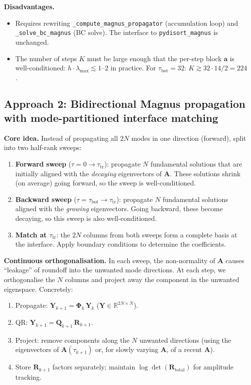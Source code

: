 \documentclass[11pt,a4paper]{article}
\newcommand{\R}{\mathbb{R}}
\newcommand{\mat}[1]{\mathbf{#1}}
\newcommand{\tbot}{\tau_{\mathrm{bot}}}
\newcommand{\ttrans}{\tau_{\mathrm{tr}}}
\theoremstyle{definition}
\begin{document}
\textbf{Disadvantages.}
\begin{itemize}[nosep]
\item Requires rewriting \texttt{\_compute\_magnus\_propagator} (accumulation
  loop) and \texttt{\_solve\_bc\_magnus} (BC solve).  The interface to
  \texttt{pydisort\_magnus} is unchanged.
\item The number of steps $K$ must be large enough that the per-step block
  $\mat{a}$ is well-conditioned:
  $h\cdot\lambda_{\max}\lesssim 1$--$2$ in practice.
  For $\tbot=32$: $K\gtrsim 32\cdot 14/2 = 224$.
\end{itemize}


\subsection{Approach 2: Bidirectional Magnus propagation with
mode-partitioned interface matching}\label{sec:approach2}

\textbf{Core idea.}  Instead of propagating all $2N$ modes in one direction
(forward), split into two half-rank sweeps:
\begin{enumerate}[nosep]
\item \textbf{Forward sweep} ($\tau=0\to\ttrans$): propagate $N$
  fundamental solutions that are initially aligned with the
  \emph{decaying} eigenvectors of $\mat{A}$.  These solutions shrink
  (on average) going forward, so the sweep is well-conditioned.
\item \textbf{Backward sweep} ($\tau=\tbot\to\ttrans$): propagate $N$
  fundamental solutions aligned with the \emph{growing} eigenvectors.
  Going backward, these become decaying, so this sweep is also
  well-conditioned.
\item \textbf{Match at $\ttrans$}: the $2N$ columns from both sweeps form
  a complete basis at the interface.  Apply boundary conditions to
  determine the coefficients.
\end{enumerate}

\textbf{Continuous orthogonalisation.}  In each sweep, the non-normality
of $\mat{A}$ causes ``leakage'' of roundoff into the unwanted mode
directions.  At each step, we orthogonalise the $N$ columns and project
away the component in the unwanted eigenspace.  Concretely:
\begin{enumerate}[nosep]
\item Propagate: $\mat{Y}_{k+1} = \mat{\Phi}_k\,\mat{Y}_k$
  \quad ($\mat{Y}\in\R^{2N\times N}$).
\item QR: $\mat{Y}_{k+1} = \mat{Q}_{k+1}\,\mat{R}_{k+1}$.
\item Project: remove components along the $N$ unwanted directions
  (using the eigenvectors of $\mat{A}(\tau_{k+1})$ or, for slowly varying
  $\mat{A}$, of a recent $\mat{A}$).
\item Store $\mat{R}_{k+1}$ factors separately; maintain
  $\log\det(\mat{R}_{\text{total}})$ for amplitude tracking.
\end{enumerate}
\end{document}
